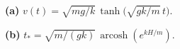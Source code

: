 \noindent\textbf{(a)} $v(t)=\sqrt{mg/k}\,\tanh\!\bigl(\sqrt{gk/m}\,t\bigr)$.

\noindent\textbf{(b)} $t_*=\sqrt{m/(gk)}\,\operatorname{arcosh}\!\left(e^{kH/m}\right)$.
